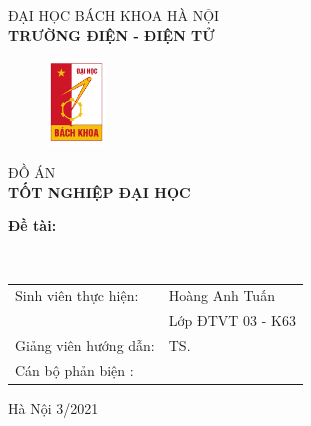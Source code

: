 \documentclass{article}%
\begin{document}
\cleardoublepage
\thispagestyle{empty} %
\begin{center}
\vspace{-12pt} ĐẠI HỌC BÁCH KHOA HÀ NỘI \\ %
\textbf{\fontsize{16pt}{0pt}\selectfont TRƯỜNG ĐIỆN - ĐIỆN TỬ}
\begin{figure}[H] %
\vspace{0.5cm} %
\centering
\includegraphics[width=1.53cm,height=2.26cm]{Images/logohust.png}
\end{figure}
\vspace{1.5cm}
\fontsize{24pt}{0pt}\selectfont ĐỒ ÁN \\ %
\vspace{12pt}
\textbf{\fontsize{32pt}{0pt}\selectfont TỐT NGHIỆP ĐẠI HỌC} %
\vspace{1.5cm}
\end{center}
\hspace{6pt}\textbf{\fontsize{14pt}{0pt}\selectfont Đề tài:}
\begin{center}
     \textbf{\fontsize{20pt}{0pt}\selectfont }\\
     \textbf{\fontsize{20pt}{0pt}\selectfont }

\vspace{1.5cm}
\begin{table}[H]
     \centering
     \begin{tabular}{l l}
          \fontsize{14pt}{0pt}\selectfont Sinh viên thực hiện:      & \fontsize{14pt}{0pt}\selectfont Hoàng Anh Tuấn \vspace{6pt} \\
          &\fontsize{14pt}{0pt}\selectfont Lớp ĐTVT 03 - K63 \vspace{6pt} \\
          \fontsize{14pt}{0pt}\selectfont Giảng viên hướng dẫn: & \fontsize{14pt}{0pt}\selectfont TS.  \vspace{6pt} \\
          
          Cán bộ phản biện : &
     \end{tabular}
\end{table}
\vspace{2.5cm} %
\fontsize{14pt}{0pt}\selectfont Hà Nội 3/2021
\end{center}
\end{document}
